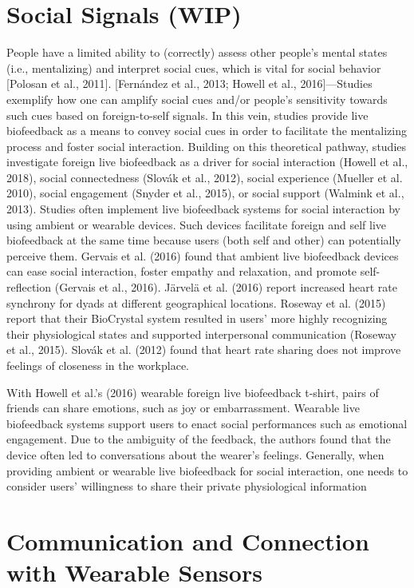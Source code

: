 \section{Social Signals (WIP)}
People have a limited ability to (correctly) assess other people’s mental states (i.e., mentalizing) and interpret social cues, which is vital for social behavior [Polosan et al., 2011]. [Fernández et al., 2013; Howell et al., 2016]—Studies exemplify how one can amplify social cues and/or people’s sensitivity towards such cues based on foreign-to-self signals. In this vein, studies provide live biofeedback as a means to convey social cues in order to facilitate the mentalizing process and foster social interaction. Building on this theoretical pathway, studies investigate foreign live biofeedback as a driver for social interaction (Howell et al., 2018), social connectedness (Slovák et al., 2012), social experience (Mueller et al. 2010), social engagement (Snyder et al., 2015), or social support (Walmink et al., 2013). Studies often implement live biofeedback systems for social interaction by using ambient or wearable devices. Such devices facilitate foreign and self live biofeedback at the same time because users (both self and other) can potentially perceive them. Gervais et al. (2016) found that ambient live biofeedback devices can ease social interaction, foster empathy and relaxation, and promote self-reflection (Gervais et
al., 2016). Järvelä et al. (2016) report increased heart rate synchrony for dyads at different geographical locations. Roseway et al. (2015) report that their BioCrystal system resulted in users’ more highly recognizing their physiological states and supported interpersonal communication (Roseway et al., 2015). Slovák et al. (2012) found that heart rate sharing does not improve feelings of closeness in the workplace.

With Howell et al.’s (2016) wearable foreign live biofeedback t-shirt, pairs of friends can share emotions, such as joy or embarrassment. Wearable live biofeedback systems support users to enact social performances such as emotional engagement. Due to the ambiguity of the feedback, the authors found that the device often led to conversations about the wearer’s feelings. Generally, when providing ambient or wearable live biofeedback for social interaction, one  needs to consider users’ willingness to share their private physiological information

\section{Communication and Connection with Wearable Sensors}
\label{lit_review:biosignals_sharing}

